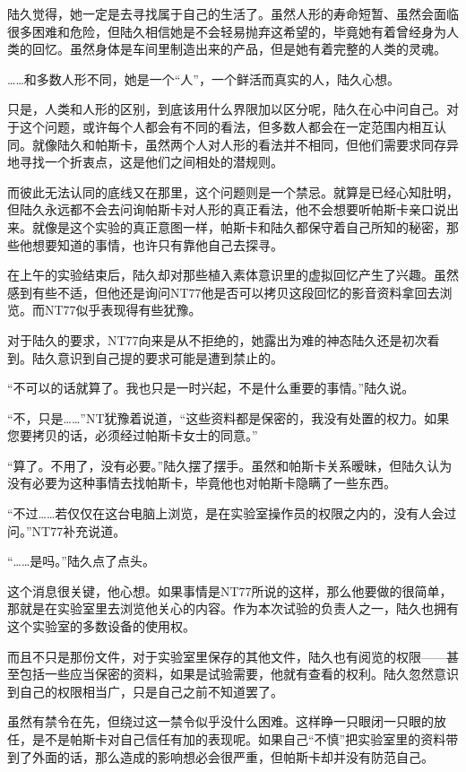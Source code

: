 陆久觉得，她一定是去寻找属于自己的生活了。虽然人形的寿命短暂、虽然会面临很多困难和危险，但陆久相信她是不会轻易抛弃这希望的，毕竟她有着曾经身为人类的回忆。虽然身体是车间里制造出来的产品，但是她有着完整的人类的灵魂。

……和多数人形不同，她是一个“人”，一个鲜活而真实的人，陆久心想。

只是，人类和人形的区别，到底该用什么界限加以区分呢，陆久在心中问自己。对于这个问题，或许每个人都会有不同的看法，但多数人都会在一定范围内相互认同。就像陆久和帕斯卡，虽然两个人对人形的看法并不相同，但他们需要求同存异地寻找一个折衷点，这是他们之间相处的潜规则。

而彼此无法认同的底线又在那里，这个问题则是一个禁忌。就算是已经心知肚明，但陆久永远都不会去问询帕斯卡对人形的真正看法，他不会想要听帕斯卡亲口说出来。就像是这个实验的真正意图一样，帕斯卡和陆久都保守着自己所知的秘密，那些他想要知道的事情，也许只有靠他自己去探寻。

在上午的实验结束后，陆久却对那些植入素体意识里的虚拟回忆产生了兴趣。虽然感到有些不适，但他还是询问NT77他是否可以拷贝这段回忆的影音资料拿回去浏览。而NT77似乎表现得有些犹豫。

对于陆久的要求，NT77向来是从不拒绝的，她露出为难的神态陆久还是初次看到。陆久意识到自己提的要求可能是遭到禁止的。

“不可以的话就算了。我也只是一时兴起，不是什么重要的事情。”陆久说。

“不，只是……”NT犹豫着说道，“这些资料都是保密的，我没有处置的权力。如果您要拷贝的话，必须经过帕斯卡女士的同意。”

“算了。不用了，没有必要。”陆久摆了摆手。虽然和帕斯卡关系暧昧，但陆久认为没有必要为这种事情去找帕斯卡，毕竟他也对帕斯卡隐瞒了一些东西。

“不过……若仅仅在这台电脑上浏览，是在实验室操作员的权限之内的，没有人会过问。”NT77补充说道。

“……是吗。”陆久点了点头。

这个消息很关键，他心想。如果事情是NT77所说的这样，那么他要做的很简单，那就是在实验室里去浏览他关心的内容。作为本次试验的负责人之一，陆久也拥有这个实验室的多数设备的使用权。

而且不只是那份文件，对于实验室里保存的其他文件，陆久也有阅览的权限——甚至包括一些应当保密的资料，如果是试验需要，他就有查看的权利。陆久忽然意识到自己的权限相当广，只是自己之前不知道罢了。

虽然有禁令在先，但绕过这一禁令似乎没什么困难。这样睁一只眼闭一只眼的放任，是不是帕斯卡对自己信任有加的表现呢。如果自己“不慎”把实验室里的资料带到了外面的话，那么造成的影响想必会很严重，但帕斯卡却并没有防范自己。

